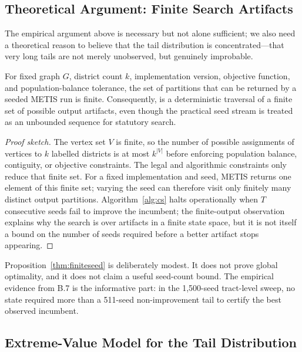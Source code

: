 \subsection{Theoretical Argument: Finite Search Artifacts}

The empirical argument above is necessary but not alone sufficient; we also
need a theoretical reason to believe that the tail distribution is
concentrated---that very long tails are not merely unobserved, but genuinely
improbable.

\begin{proposition}
\label{thm:finiteseed}
For fixed graph $G$, district count $k$, implementation version, objective
function, and population-balance tolerance, the set of partitions that can be
returned by a seeded METIS run is finite.
Consequently, \cs{} is a deterministic traversal of a finite set of possible
output artifacts, even though the practical seed stream is treated as an
unbounded sequence for statutory search.
\end{proposition}

\begin{proof}[Proof sketch]
The vertex set $V$ is finite, so the number of possible assignments of
vertices to $k$ labelled districts is at most $k^{|V|}$ before enforcing
population balance, contiguity, or objective constraints.
The legal and algorithmic constraints only reduce that finite set.
For a fixed implementation and seed, METIS returns one element of this finite
set; varying the seed can therefore visit only finitely many distinct output
partitions.
Algorithm~\ref{alg:cs} halts operationally when $T$ consecutive seeds fail to
improve the incumbent; the finite-output observation explains why the search is
over artifacts in a finite state space, but it is not itself a bound on the
number of seeds required before a better artifact stops appearing.
\end{proof}

\begin{remark}
Proposition~\ref{thm:finiteseed} is deliberately modest.
It does not prove global optimality, and it does not claim a useful seed-count
bound.
The empirical evidence from B.7 is the informative part: in the 1{,}500-seed
tract-level sweep, no state required more than a 511-seed non-improvement tail
to certify the best observed incumbent.
\end{remark}

\subsection{Extreme-Value Model for the Tail Distribution}

